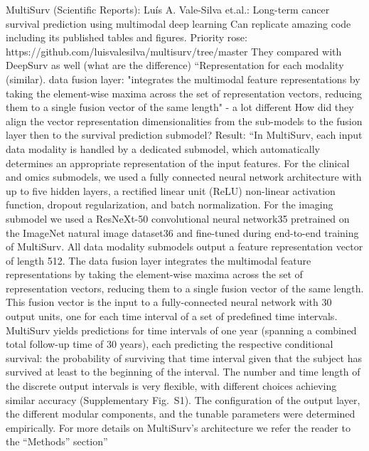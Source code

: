 \documentclass{article}%
\begin{document}
\newline%
\newline%
%
MultiSurv (Scientific Reports): Luís A. Vale{-}Silva et.al.: Long{-}term cancer survival prediction using multimodal deep learning%
\newline%
\newline%
%
Can replicate amazing code including its published tables and figures.%
\newline%
\newline%
%
Priority rose: https://github.com/luisvalesilva/multisurv/tree/master %
\newline%
\newline%
%
They compared with DeepSurv as well (what are the difference) %
\newline%
\newline%
%
“Representation for each modality (similar). data fusion layer: "integrates the multimodal feature representations by taking the element{-}wise maxima across the set of representation vectors, reducing them to a single fusion vector of the same length" {-} a lot different%
\newline%
\newline%
%
%
\newline%
\newline%
%
How did they align the vector representation dimensionalities from the sub{-}models to the fusion layer then to the survival prediction submodel? %
\newline%
\newline%
%
Result: “In MultiSurv, each input data modality is handled by a dedicated submodel, which automatically determines an appropriate representation of the input features. For the clinical and omics submodels, we used a fully connected neural network architecture with up to five hidden layers, a rectified linear unit (ReLU) non{-}linear activation function, dropout regularization, and batch normalization. For the imaging submodel we used a ResNeXt{-}50 convolutional neural network35 pretrained on the ImageNet natural image dataset36 and fine{-}tuned during end{-}to{-}end training of MultiSurv. All data modality submodels output a feature representation vector of length 512. The data fusion layer integrates the multimodal feature representations by taking the element{-}wise maxima across the set of representation vectors, reducing them to a single fusion vector of the same length. This fusion vector is the input to a fully{-}connected neural network with 30 output units, one for each time interval of a set of predefined time intervals. MultiSurv yields predictions for time intervals of one year (spanning a combined total follow{-}up time of 30 years), each predicting the respective conditional survival: the probability of surviving that time interval given that the subject has survived at least to the beginning of the interval. The number and time length of the discrete output intervals is very flexible, with different choices achieving similar accuracy (Supplementary Fig.~S1). The configuration of the output layer, the different modular components, and the tunable parameters were determined empirically. For more details on MultiSurv’s architecture we refer the reader to the “Methods” section”%
\end{document}
